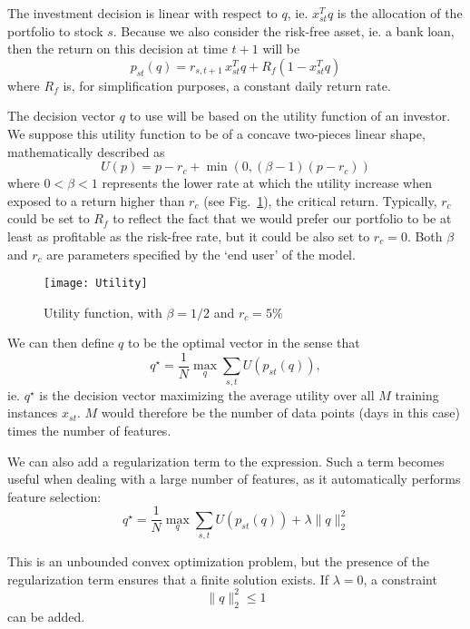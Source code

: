 \documentclass[11pt,fleqn]{article}
\newcommand{\figref}[1]{Fig.~\ref{#1}}
\begin{document}
The investment decision is linear with respect to $q$, ie. $x_{st}^Tq$ is the allocation
of the portfolio to stock $s$. Because we also consider the risk-free asset, ie. a bank
loan, then the return on this decision at time $t+1$ will be
\begin{equation*}
  p_{st}(q) = r_{s,t+1}\,x_{st}^Tq + R_f(1-x_{st}^Tq)
\end{equation*}
where $R_f$ is, for simplification purposes, a constant daily return rate. 

The decision vector $q$ to use will be based on the utility function of an investor. We
suppose this utility function to be of a concave two-pieces linear shape, mathematically
described as 
\begin{equation*}
  U(p) = p-r_c + \min(0,(\beta-1)(p-r_c))
\end{equation*}
where $0<\beta<1$ represents the lower rate at which the utility increase when exposed to
a return higher than $r_c$ (see \figref{fig:utility}), the critical return. Typically,
$r_c$ could be set to $R_f$ to reflect the fact that we would prefer our portfolio to be
at least as profitable as the risk-free rate, but it could be also set to $r_c=0$. Both
$\beta$ and $r_c$ are parameters specified by the `end user' of the model.

\begin{figure}
  \centering
  \texttt{[image: Utility]}
  \caption{Utility function, with $\beta=1/2$ and $r_c=5\%$}
  \label{fig:utility}
\end{figure}

We can then define $q$ to be the optimal vector in the sense that
\begin{equation*}
  q^\star = \frac{1}{N} \max_q \sum_{s,t} U(p_{st}(q)),
\end{equation*}
ie. $q^\star$ is the decision vector maximizing the average utility over all $M$ training
instances $x_{st}$. $M$ would therefore be the number of data points (days in this case)
times the number of features.

We can also add a regularization term to the expression. Such a term becomes useful when
dealing with a large number of features, as it automatically performs feature selection:
\begin{equation*}
  q^\star = \frac{1}{N} \max_q \sum_{s,t} U(p_{st}(q)) + \lambda \|q\|_2^2
\end{equation*}

This is an unbounded convex optimization problem, but the presence of the regularization
term ensures that a finite solution exists. If $\lambda=0$, a constraint 
\begin{equation*}
  \|q\|_2^2\leq1
\end{equation*}
can be added.
\end{document}
